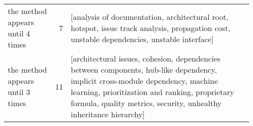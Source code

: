 \begin{tabular}{lrl}
      the method appears until 4 times &      7 &                                                                                                                                                                                                                                                                                                                                                                                                                                                                                                                                                                                                                                                                                                                                                                                                                                                                                                                                                                                                                                                                                                                                                                                                                                                                                                                                                                                         [analysis of documentation, architectural root, hotspot, issue track analysis, propagation cost, unstable dependencies, unstable interface] \\
      the method appears until 3 times &     11 &                                                                                                                                                                                                                                                                                                                                                                                                                                                                                                                                                                                                                                                                                                                                                                                                                                                                                                                                                                                                                                                                                                                                                                                                                                                                             [architectural issues, cohesion, dependencies between components, hub-like dependency, implicit cross-module dependency, machine learning, prioritization and ranking, proprietary formula, quality metrics, security, unhealthy inheritance hierarchy] \\

\end{tabular}
